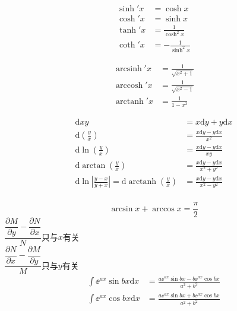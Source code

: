 \documentclass{article}
\DeclareMathOperator{\arccosh}{arccosh}
\DeclareMathOperator{\arcsinh}{arcsinh}
\DeclareMathOperator{\arctanh}{arctanh}
\begin{document}
\begin{align*}
    \sinh' x & = \cosh x                \\
    \cosh' x & = \sinh x                \\
    \tanh' x & = \frac{1}{\cosh^{2}x}   \\
    \coth' x & =- \frac{1}{\sinh^{2} x}
\end{align*}

\begin{align*}
    \arcsinh' x & =\frac{1}{\sqrt{x^{2}+1}} \\
    \arccosh' x & =\frac{1}{\sqrt{x^{2}-1}} \\
    \arctanh' x & =\frac{1}{1-x^{2}}
\end{align*}

\begin{align*}
    \mathrm{d} xy
    & =x\mathrm{d}y+y\mathrm{d}x                     \\
    \mathrm{d} \left( \frac{y}{x} \right)
    & =\frac{x\mathrm{d}y-y\mathrm{d}x}{x^{2}}       \\
    \mathrm{d} \ln \left( \frac{y}{x} \right)
    & =\frac{x\mathrm{d}y-y\mathrm{d}x}{xy}          \\
    \mathrm{d} \arctan \left( \frac{y}{x} \right)
    & =\frac{x\mathrm{d}y-y\mathrm{d}x}{x^{2}+y^{2}} \\
    \mathrm{d} \ln \left| \frac{y - x}{y + x} \right|=\mathrm{d}
    \arctanh \left( \frac{y}{x} \right) &
    =\frac{x\mathrm{d}y-y\mathrm{d}x}{x^{2}-y^{2}} \\
\end{align*}

\[\arcsin x +\arccos x =\frac{\pi}{2} \]
\(\dfrac{\dfrac{\partial M}{\partial y} - \dfrac{\partial N}{\partial
x}}{N}\)只与\(x\)有关 \\
\(\dfrac{\dfrac{\partial N}{\partial x} - \dfrac{\partial M}{\partial
y}}{M}\)只与\(y\)有关 \\

\begin{align*}
    \int \ee^{ax} \sin bx \mathrm{d}x & =\frac{a\ee^{ax} \sin bx -
    b\ee^{ax}\cos bx}{a^{2}+b^{2}} \\
    \int \ee^{ax} \cos bx \mathrm{d}x & =\frac{a\ee^{ax} \sin bx +
    b\ee^{ax}\cos bx}{a^{2}+b^{2}} \\
\end{align*}
\end{document}
